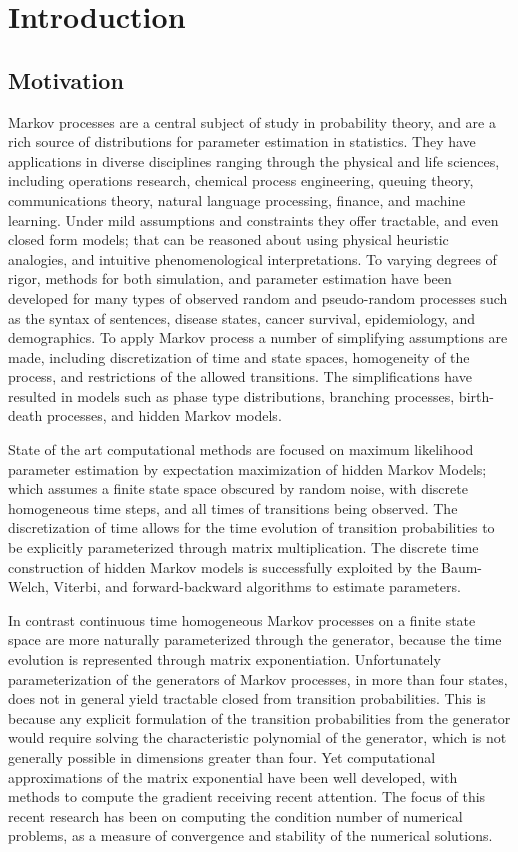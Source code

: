 \chapter{Introduction}
\section{Motivation}
Markov processes are a central subject of study in probability theory, and are a rich source
of distributions for parameter estimation in statistics\cite{billingsley_probability_1995,rogers_diffusions_2000,rogers_diffusions_2000-1}.
They have applications in diverse disciplines ranging through the physical and life
sciences, including operations research, chemical process engineering, queuing theory,
communications theory, natural language processing, finance, and machine learning. Under
mild assumptions and constraints they offer tractable, and even closed form models; that can
be reasoned about using physical heuristic analogies, and intuitive phenomenological
interpretations. To varying degrees of rigor, methods for both simulation, and parameter
estimation have been developed for many types of observed random and pseudo-random processes
such as the syntax of sentences, disease states, cancer survival, epidemiology, and
demographics. To apply Markov process a number of simplifying assumptions are made,
including discretization of time and state spaces, homogeneity of the process, and
restrictions of the allowed transitions. The simplifications have resulted in models such as
phase type distributions, branching processes, birth-death processes, and hidden Markov
models.

State of the art computational methods are focused on maximum likelihood parameter
estimation by expectation maximization of hidden Markov Models; which assumes a finite state
space obscured by random noise, with discrete homogeneous time steps, and all times of
transitions being observed. The discretization of time allows for the time evolution of
transition probabilities to be explicitly parameterized through matrix multiplication. The
discrete time construction of hidden Markov models is successfully exploited by the
Baum-Welch, Viterbi, and forward-backward algorithms to estimate parameters.

In contrast continuous time homogeneous Markov processes on a finite state space are more
naturally parameterized through the generator, because the time evolution is represented
through matrix exponentiation. Unfortunately parameterization of the generators of Markov
processes, in more than four states, does not in general yield tractable closed from
transition probabilities. This is because any explicit formulation of the transition
probabilities from the generator would require solving the characteristic polynomial of the
generator, which is not generally possible in dimensions greater than four. Yet
computational approximations of the matrix exponential have been well developed, with
methods to compute the gradient receiving recent attention. The focus of this recent
research has been on computing the condition number of numerical problems, as a measure of 
convergence and stability of the numerical solutions\cite{al-mohy_computing_2009}.

